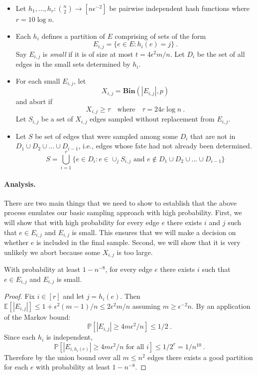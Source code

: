 \documentclass[11pt]{article}
\newcommand{\expec}[1]{\mathbb E\left [ #1 \right ]}
\newcommand{\prob}[1]{\mathbb P \left [ #1 \right ]}
\newcommand{\bin}{{\mathbf{Bin}}}
\begin{document}
\begin{itemize}
\item Let $h_1,\ldots ,h_r:{n \choose 2} \rightarrow [n\epsilon^{-2}]$ be pairwise independent hash functions where $r=10 \log n$.
\item  Each $h_i$ defines a partition of $E$ comprising of sets of the form
 \[E_{i,j}=\{e\in E: h_i(e)=j\} \ .\] 
Say $E_{i,j}$ is \emph{small} if it is of size at most $t=4\epsilon^{2}m/n$. Let $D_i$ be the set of all edges in the small sets determined by $h_i$.
\item For each small $E_{i,j}$, let 
\[X_{i,j}=\bin(|E_{i,j}|,p)\] and abort if 
\[X_{i,j} \geq \tau ~~~ \mbox{ where } ~~~ \tau =24 c\log n \ .\]
Let $S_{i,j}$ be a set of $X_{i,j}$ edges sampled without replacement from $E_{i,j}$.

\item Let $S$ be set of edges that were sampled among some $D_i$ that are not in $D_1\cup D_2 \cup \ldots \cup D_{i-1}$, i.e., edges whose fate had not already been determined.
\[
S=\bigcup_{i=1}^{r} \{e\in D_i: e\in \cup_j S_{i,j} \mbox{ and } e\not \in D_1\cup D_2 \cup \ldots \cup D_{i-1}\}
\]
\end{itemize}

\paragraph{Analysis.} There are two main things that we need to show to establish that the above process emulates our basic sampling approach with high probability. First, we will show that with high probability for every edge $e$ there exists $i$ and $j$ such that $e\in E_{i,j}$ and $E_{i,j}$ is small. This ensures that we will make a decision on whether $e$ is included in the final sample. Second, we will show that it is very unlikely we abort because some $X_{i,j}$ is too large. 


\begin{lemma}
With probability at least $1-n^{-8}$, for every edge $e$ there exists $i$ such that $e\in E_{i,j}$ and $E_{i,j}$ is small. \end{lemma}
\begin{proof}
Fix $i\in [r]$ and let $j=h_i(e)$. Then $\expec{|E_{i,j}|}\leq 1+\epsilon^{2} (m-1)/n\leq 2\epsilon^{2} m/n$ assuming $m\geq \epsilon^{-2}n$. By an application of the Markov bound:
\[
\prob{|E_{i,j}|\geq 4m\epsilon^{2}/n}\leq 1/2 \ .
\] 
Since each $h_i$ is independent,
\[
\prob{|E_{i,h_i(e)}|\geq 4m\epsilon^{2}/n \mbox{ for all $i$} }\leq 1/2^r =  1/n^{10} \ .
\]  
Therefore by the union bound over all $m\leq n^2$ edges there exists a good partition for each $e$ with probability at least $1-n^{-8}$.
\end{proof}
\end{document}
